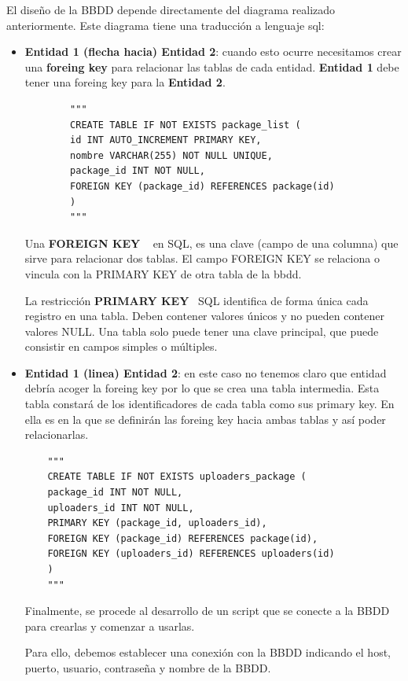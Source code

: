 \documentclass[a4paper, 12pt]{book}
\begin{document}
El diseño de la BBDD depende directamente del diagrama realizado anteriormente. 
Este diagrama tiene una traducción a lenguaje sql:
\begin{itemize}
	\item \textbf {Entidad 1 (flecha hacia) Entidad 2}: cuando esto ocurre necesitamos crear una \textbf {foreing key} para relacionar las tablas de cada entidad. \textbf {Entidad 1} debe tener una foreing key para la \textbf {Entidad 2}.
	
	\begin{verbatim}
		"""
		CREATE TABLE IF NOT EXISTS package_list (
		id INT AUTO_INCREMENT PRIMARY KEY,
		nombre VARCHAR(255) NOT NULL UNIQUE,
		package_id INT NOT NULL,
		FOREIGN KEY (package_id) REFERENCES package(id)
		)
		"""
	\end{verbatim}
	
	Una \textbf {FOREIGN KEY} ~\cite{thedataschool:_foreingkey} en SQL, es una clave (campo de una columna) que sirve para relacionar dos tablas. El campo FOREIGN KEY se relaciona o vincula con la PRIMARY KEY de otra tabla de la bbdd.
	
	La restricción \textbf {PRIMARY KEY}~\cite{thedataschool:_primarykey} SQL identifica de forma única cada registro en una tabla.
	Deben contener valores únicos y no pueden contener valores NULL.
	Una tabla solo puede tener una clave principal, que puede consistir en campos simples o múltiples.
	
	\item \textbf {{Entidad 1 (linea) Entidad 2}}: en este caso no tenemos claro que entidad debría acoger la foreing key por lo que se crea una tabla intermedia.
	Esta tabla constará de los identificadores de cada tabla como sus primary key.
	En ella es en la que se definirán las foreing key hacia ambas tablas y así poder relacionarlas.
	
	\begin{verbatim}
	"""
	CREATE TABLE IF NOT EXISTS uploaders_package (
	package_id INT NOT NULL,
	uploaders_id INT NOT NULL,
	PRIMARY KEY (package_id, uploaders_id),
	FOREIGN KEY (package_id) REFERENCES package(id),
	FOREIGN KEY (uploaders_id) REFERENCES uploaders(id)
	)
	"""
	\end{verbatim}
	
	Finalmente, se procede al desarrollo de un script que se conecte a la BBDD para crearlas y comenzar a usarlas.
	
	Para ello, debemos establecer una conexión con la BBDD indicando el host, puerto, usuario, contraseña y nombre de la BBDD.
	

\end{itemize}
\end{document}
